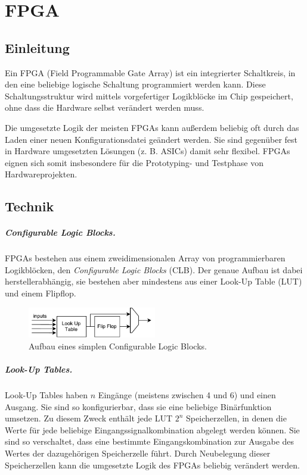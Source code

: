 \chapter{FPGA} %
\label{FPGA} %

\section{Einleitung}
Ein FPGA (Field Programmable Gate Array) ist ein integrierter Schaltkreis, in den eine beliebige logische Schaltung programmiert werden kann. Diese Schaltungsstruktur wird mittels vorgefertiger Logikblöcke im Chip gespeichert, ohne dass die Hardware selbst verändert werden muss.

Die umgesetzte Logik der meisten FPGAs kann außerdem beliebig oft durch
das Laden einer neuen Konfigurationsdatei geändert werden. Sie sind
gegenüber fest in Hardware umgesetzten Lösungen (z. B. ASICs) damit sehr
flexibel. FPGAs eignen sich somit insbesondere für die Prototyping- und
Testphase von Hardwareprojekten.~\cite[S. 8]{SynthesisFPGA}

\section{Technik}
\paragraph{Configurable Logic Blocks.} FPGAs bestehen aus einem zweidimensionalen Array von programmierbaren Logikblöcken, den \emph{Configurable Logic Blocks} (CLB). \cite[S. 11]{Chu} Der genaue Aufbau ist dabei herstellerabhängig, sie bestehen aber mindestens aus einer Look-Up Table (LUT) und einem Flipflop. \cite[S. 8]{SynthesisFPGA}

\begin{figure} [ht]
  \centering
  \includegraphics[width=0.5\textwidth]{Figures/clb}
  \caption{Aufbau eines simplen Configurable Logic Blocks.}
  \label{fig:clb}
\end{figure}

\paragraph{Look-Up Tables.} Look-Up Tables haben $n$ Eingänge (meistens zwischen 4 und 6) und einen Ausgang. Sie sind so konfigurierbar, dass sie eine beliebige Binärfunktion umsetzen. Zu diesem Zweck enthält jede LUT $2^n$ Speicherzellen, in denen die Werte für jede beliebige Eingangssignalkombination abgelegt werden können. Sie sind so verschaltet, dass eine bestimmte Eingangskombination zur Ausgabe des Wertes der dazugehörigen Speicherzelle führt. \cite[S. 12f.]{Chu} Durch Neubelegung dieser Speicherzellen kann die umgesetzte Logik des FPGAs beliebig verändert werden.

